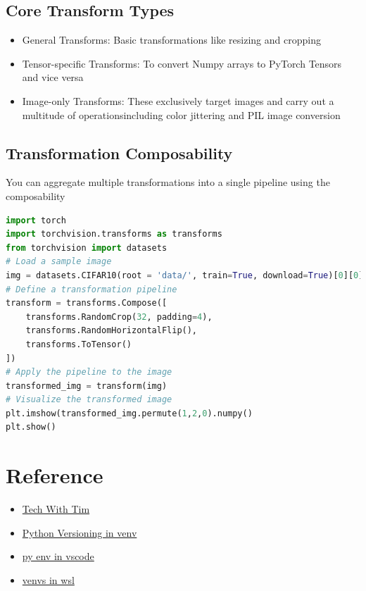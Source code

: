 \documentclass{article}
\begin{document}
\subsection{Core Transform Types}
\begin{itemize}
    \item General Transforms: Basic transformations like resizing and cropping
    \item Tensor-specific Transforms: To convert Numpy arrays to PyTorch Tensors and vice versa
    \item Image-only Transforms: These exclusively target images and carry out a multitude of operationsincluding color jittering and PIL image conversion
\end{itemize}
\subsection{Transformation Composability}
You can aggregate multiple transformations into a single pipeline using the composability
\begin{lstlisting}[language=Python]
import torch
import torchvision.transforms as transforms
from torchvision import datasets
# Load a sample image
img = datasets.CIFAR10(root = 'data/', train=True, download=True)[0][0]
# Define a transformation pipeline
transform = transforms.Compose([
    transforms.RandomCrop(32, padding=4),
    transforms.RandomHorizontalFlip(),
    transforms.ToTensor()
])
# Apply the pipeline to the image
transformed_img = transform(img)
# Visualize the transformed image
plt.imshow(transformed_img.permute(1,2,0).numpy()
plt.show()
\end{lstlisting}
\section{Reference}
\begin{itemize}
    \item \href{https://www.youtube.com/watch?v=Y21OR1OPC9As}{Tech With Tim}
    \item \href{https://packaging.python.org/en/latest/guides/installing-using-pip-and-virtual-environments/}{Python Versioning in venv}
    \item \href{https://stackoverflow.com/questions/68376749/problems-installing-python-packages-into-a-virtual-environment-in-visual-studio}{py env in vscode}
    \item \href{https://stackoverflow.com/questions/61528500/installing-venv-for-python3-in-wsl-ubuntu}{venvs in wsl}
\end{itemize}
\end{document}
